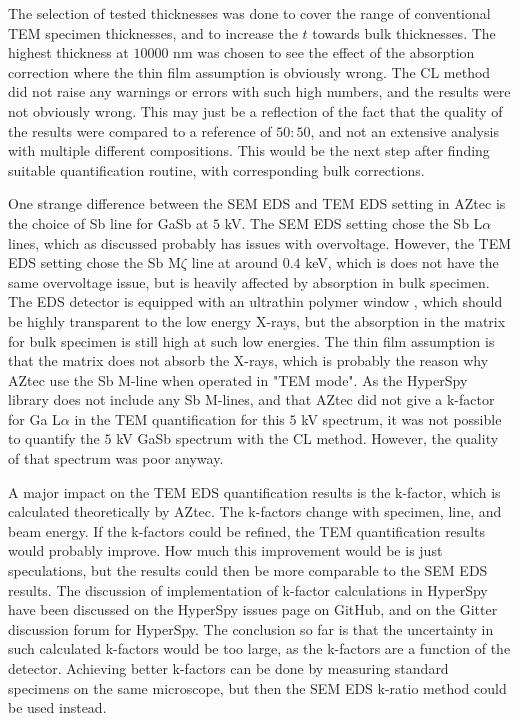 The selection of tested thicknesses was done to cover the range of conventional TEM specimen thicknesses, and to increase the $t$ towards bulk thicknesses.
The highest thickness at $10000$ nm was chosen to see the effect of the absorption correction where the thin film assumption is obviously wrong.
The CL method did not raise any warnings or errors with such high numbers, and the results were not obviously wrong.
This may just be a reflection of the fact that the quality of the results were compared to a reference of $50:50$, and not an extensive analysis with multiple different compositions.
This would be the next step after finding suitable quantification routine, with corresponding bulk corrections.


One strange difference between the SEM EDS and TEM EDS setting in AZtec is the choice of Sb line for GaSb at $5$ kV.
The SEM EDS setting chose the Sb L$\alpha$ lines, which as discussed probably has issues with overvoltage.
However, the TEM EDS setting chose the Sb M$\zeta$ line at around $0.4$ keV, which is does not have the same overvoltage issue, but is heavily affected by absorption in bulk specimen.
The EDS detector is equipped with an ultrathin polymer window \cite{xmaxn_datasheet}, which should be highly transparent to the low energy X-rays, but the absorption in the matrix for bulk specimen is still high at such low energies.
The thin film assumption is that the matrix does not absorb the X-rays, which is probably the reason why AZtec use the Sb M-line when operated in "TEM mode".
As the HyperSpy library does not include any Sb M-lines, and that AZtec did not give a k-factor for Ga L$\alpha$ in the TEM quantification for this $5$ kV spectrum, it was not possible to quantify the $5$ kV GaSb spectrum with the CL method.
However, the quality of that spectrum was poor anyway.


A major impact on the TEM EDS quantification results is the k-factor, which is calculated theoretically by AZtec.
The k-factors change with specimen, line, and beam energy.
If the k-factors could be refined, the TEM quantification results would probably improve.
How much this improvement would be is just speculations, but the results could then be more comparable to the SEM EDS results.
The discussion of implementation of k-factor calculations in HyperSpy have been discussed on the HyperSpy issues page on GitHub, and on the Gitter discussion forum for HyperSpy.
The conclusion so far is that the uncertainty in such calculated k-factors would be too large, as the k-factors are a function of the detector.
Achieving better k-factors can be done by measuring standard specimens on the same microscope, but then the SEM EDS k-ratio method could be used instead.


